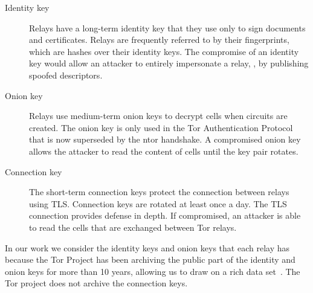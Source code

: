 \begin{description}
    \item[Identity key]  Relays have a long-term identity key that they use only 
        to sign documents and certificates.  Relays are frequently referred to
        by their fingerprints, which are hashes over their identity keys.  The
        compromise of an identity key would allow an attacker to entirely
        impersonate a relay, \eg, by publishing spoofed descriptors.
    \item[Onion key]  Relays use medium-term onion keys to decrypt cells when
        circuits are created.  The onion key is only used in the Tor
        Authentication Protocol that is now superseded by the ntor handshake.  A
        compromised onion key allows the attacker to read the content of cells
        until the key pair rotates.
    \item[Connection key] The short-term connection keys protect the connection
        between relays using TLS.  Connection keys are rotated at least once a
        day.  The TLS connection provides defense in depth.  If compromised, an
        attacker is able to read the cells that are exchanged between Tor
        relays.
\end{description}

In our work we consider the identity keys and onion keys that each relay 
has because the Tor Project has been archiving the public part of the 
identity and onion keys for more than 10 years, allowing us to draw on a 
rich data set~\cite{collector}. The Tor project does not archive the 
connection keys.


